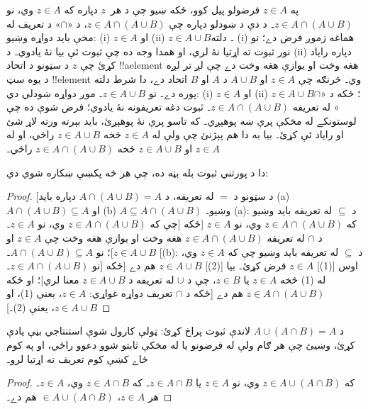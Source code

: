 \documentclass[../../../include/open-logic-section]{subfiles}
\begin{document}
په $z \in A$ فرضولو پيل کوو، ځکه ښيو چې د هر~$z$ دپاره
که $z \in A$ وي، نو $z \in A \cap (A \cup B)$۔ د دې
د ښودلو دپاره چې $z
\in A \cap (A \cup B)$، د «$\cap$» د تعريف له مخې بايد
دواړه وښيو: (i) $z \in A$ او (ii) $z \in A \cup B$۔
دلته (i) هماغه زموږ فرض دے؛ نو نور ثبوت ته اړتيا نۀ لري،
او همدا وجه ده چې ثبوت ئې بيا نۀ يادوي۔ د (ii) دپاره
راياد کړئ چې $z$ د سټونو د اتحاد !!a{element} هغه وخت او
يوازې هغه وخت دے چې لږ تر لږه د يوه سټ !!{element} وي۔
څرنګه چې $z \in A$ او $A \cup B$ د $A$ او $B$ اتحاد دے،
دا شرط دلته پوره دے۔ نو $z \in A \cup B$۔ موږ دواړه
ښودلي دي: (i) $z \in A$ او (ii) $z \in A \cup B$؛ ځکه
د «$\cap$» له تعريفه $z \in A \cap (A \cup B)$۔
ثبوت دغه تعريفونه نۀ يادوي؛ فرض شوې ده چې لوستونکے له
مخکې پرې ښه پوهېږي۔ که تاسو پرې نۀ پوهېږئ، بايد بېرته
ورته لاړ شئ او راياد ئې کړئ۔ بيا به دا هم پېژنئ چې ولې
له $z
\in A$ څخه $z \in A \cup B$ راځي، او له $z \in A$ او
$z \in A \cup B$ څخه $z \in A \cap (A \cup B)$ راځي۔

دا د پورتني ثبوت بله بڼه ده، چې هر څه پکښې ښکاره شوي دي:
\begin{proof}{}
[د سټونو د $=$ له تعريفه، د $A \cap (A \cup B) = A$ دپاره
بايد (a) $A \cap (A \cup B) \subseteq A$ او
(b) $A \subseteq A \cap (A \cup B)$ وښيو۔ (a): د $\subseteq$ له تعريفه
بايد وښيو چې که $z \in A \cap (A \cup B)$ وي، نو
$z \in A$۔] که $z \in A
\cap (A \cup B)$ وي، نو $z \in A$ [ځکه د $\cap$ له تعريفه
$z
  \in A \cap (A \cup B)$ هغه وخت او يوازې هغه وخت چې
$z \in A$ او $z \in A \cup B$]؛ نو
$A
\cap (A \cup B) \subseteq A$۔ [(b): د $\subseteq$ له تعريفه
بايد وښيو چې که $z \in A$ وي، نو
$z \in A \cap (A \cup B)$۔] اوس [(1)] $z \in A$ فرض کړئ۔
بيا [(2)] $z \in A \cup B$ هم دے [ځکه له (1) څخه
$z \in A$ يا $z \in B$، چې د $\cup$ له تعريفه
د $z
  \in A \cup B$ معنا لري]؛ او ځکه $z \in A \cap (A \cup B)$
هم دے [ځکه د $\cap$ تعريف دواړه غواړي: $z \in A$، يعنې
(1)، او $z
  \in A \cup B$، يعنې (2)۔]
\end{proof}

\begin{prob}
د $A \cup (A \cap B) = A$ لاندې ثبوت پراخ کړئ: ټولې
کارول شوې استنتاجي بڼې يادې کړئ، وښيئ چې هر ګام ولې
له فرضونو يا له مخکې ثابتو شوو دعوو راځي، او په کوم
ځاے کښې کوم تعريف ته اړتيا لرو۔
\begin{proof}
  که $z \in A \cup (A \cap B)$ وي، نو $z \in A$ يا
  $z \in A \cap B$۔ که $z \in A \cap B$ وي، $z \in A$۔
  هر $z \in A$، $\in A \cup (A
  \cap B)$ هم دے۔
\end{proof}
\end{prob}
\end{document}
